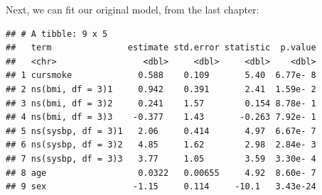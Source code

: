 \documentclass[
]{book}
\newenvironment{Shaded}{\begin{snugshade}}{\end{snugshade}}
\newcommand{\DataTypeTok}[1]{\textcolor[rgb]{0.13,0.29,0.53}{#1}}
\newcommand{\DecValTok}[1]{\textcolor[rgb]{0.00,0.00,0.81}{#1}}
\newcommand{\FloatTok}[1]{\textcolor[rgb]{0.00,0.00,0.81}{#1}}
\newcommand{\KeywordTok}[1]{\textcolor[rgb]{0.13,0.29,0.53}{\textbf{#1}}}
\newcommand{\NormalTok}[1]{#1}
\newcommand{\OperatorTok}[1]{\textcolor[rgb]{0.81,0.36,0.00}{\textbf{#1}}}
\newcommand{\StringTok}[1]{\textcolor[rgb]{0.31,0.60,0.02}{#1}}
\begin{document}
Next, we can fit our original model, from the last chapter:

\begin{Shaded}
\end{Shaded}

\begin{verbatim}
## # A tibble: 9 x 5
##   term               estimate std.error statistic  p.value
##   <chr>                 <dbl>     <dbl>     <dbl>    <dbl>
## 1 cursmoke             0.588    0.109       5.40  6.77e- 8
## 2 ns(bmi, df = 3)1     0.942    0.391       2.41  1.59e- 2
## 3 ns(bmi, df = 3)2     0.241    1.57        0.154 8.78e- 1
## 4 ns(bmi, df = 3)3    -0.377    1.43       -0.263 7.92e- 1
## 5 ns(sysbp, df = 3)1   2.06     0.414       4.97  6.67e- 7
## 6 ns(sysbp, df = 3)2   4.85     1.62        2.98  2.84e- 3
## 7 ns(sysbp, df = 3)3   3.77     1.05        3.59  3.30e- 4
## 8 age                  0.0322   0.00655     4.92  8.60e- 7
## 9 sex                 -1.15     0.114     -10.1   3.43e-24
\end{verbatim}

\begin{Shaded}
\end{Shaded}
\end{document}
